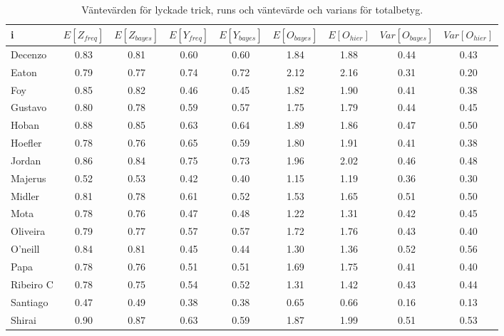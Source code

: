 \documentclass{article}
\begin{document}
\begin{table}[h]
    \centering
    \caption{Väntevärden för lyckade trick, runs och väntevärde och varians för totalbetyg.}
    \label{tab:exp_scores}
    \begin{tabular}{lcccccccc}
        \toprule
        i & $E[Z_{freq}]$ & $E[Z_{bayes}]$ & $E[Y_{freq}]$ & $E[Y_{bayes}]$ & $E[O_{bayes}]$ & $E[O_{hier}]$ & $Var[O_{bayes}]$ & $Var[O_{hier}]$ \\
        \midrule
        Decenzo & 0.83 & 0.81 & 0.60 & 0.60 & 1.84 & 1.88 & 0.44 & 0.43 \\
        Eaton & 0.79 & 0.77 & 0.74 & 0.72 & 2.12 & 2.16 & 0.31 & 0.20 \\
        Foy & 0.85 & 0.82 & 0.46 & 0.45 & 1.82 & 1.90 & 0.41 & 0.38 \\
        Gustavo & 0.80 & 0.78 & 0.59 & 0.57 & 1.75 & 1.79 & 0.44 & 0.45 \\
        Hoban & 0.88 & 0.85 & 0.63 & 0.64 & 1.89 & 1.86 & 0.47 & 0.50 \\
        Hoefler & 0.78 & 0.76 & 0.65 & 0.59 & 1.80 & 1.91 & 0.41 & 0.38 \\
        Jordan & 0.86 & 0.84 & 0.75 & 0.73 & 1.96 & 2.02 & 0.46 & 0.48 \\
        Majerus & 0.52 & 0.53 & 0.42 & 0.40 & 1.15 & 1.19 & 0.36 & 0.30 \\
        Midler & 0.81 & 0.78 & 0.61 & 0.52 & 1.53 & 1.65 & 0.51 & 0.50 \\
        Mota & 0.78 & 0.76 & 0.47 & 0.48 & 1.22 & 1.31 & 0.42 & 0.45 \\
        Oliveira & 0.79 & 0.77 & 0.57 & 0.57 & 1.72 & 1.76 & 0.43 & 0.40 \\
        O’neill & 0.84 & 0.81 & 0.45 & 0.44 & 1.30 & 1.36 & 0.52 & 0.56 \\
        Papa & 0.78 & 0.76 & 0.51 & 0.51 & 1.69 & 1.75 & 0.41 & 0.40 \\
        Ribeiro C & 0.78 & 0.75 & 0.54 & 0.52 & 1.31 & 1.42 & 0.43 & 0.44 \\
        Santiago & 0.47 & 0.49 & 0.38 & 0.38 & 0.65 & 0.66 & 0.16 & 0.13 \\
        Shirai & 0.90 & 0.87 & 0.63 & 0.59 & 1.87 & 1.99 & 0.51 & 0.53 \\
        \bottomrule
    \end{tabular}
\end{table}
\end{document}
